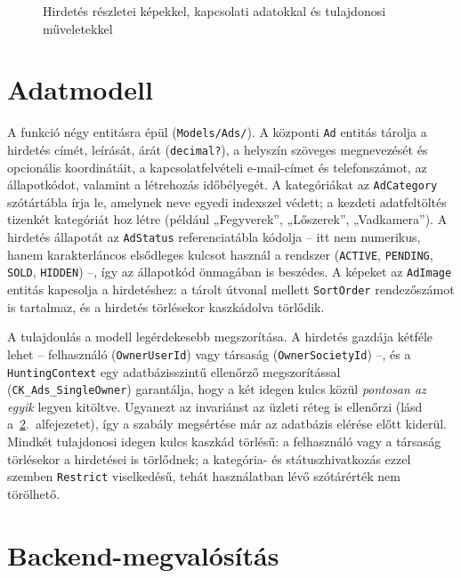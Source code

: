 \begin{figure}[htbp]
	\centering
	\caption{Hirdetés részletei képekkel, kapcsolati adatokkal és tulajdonosi műveletekkel}
	\label{fig:ad-detail-screen}
\end{figure}

\section{Adatmodell}
\label{sec:ads-adatmodell}

A funkció négy entitásra épül (\texttt{Models/Ads/}). A központi \texttt{Ad} entitás tárolja a
hirdetés címét, leírását, árát (\texttt{decimal?}), a helyszín szöveges megnevezését és opcionális
koordinátáit, a kapcsolatfelvételi e-mail-címet és telefonszámot, az állapotkódot, valamint a
létrehozás időbélyegét. A kategóriákat az \texttt{AdCategory} szótártábla írja le, amelynek neve
egyedi indexszel védett; a kezdeti adatfeltöltés tizenkét kategóriát hoz létre (például
„Fegyverek”, „Lőszerek”, „Vadkamera”). A hirdetés állapotát az \texttt{AdStatus} referenciatábla
kódolja -- itt nem numerikus, hanem karakterláncos elsődleges kulcsot használ a rendszer
(\texttt{ACTIVE}, \texttt{PENDING}, \texttt{SOLD}, \texttt{HIDDEN}) --, így az állapotkód
önmagában is beszédes. A képeket az \texttt{AdImage} entitás kapcsolja a hirdetéshez: a tárolt
útvonal mellett \texttt{SortOrder} rendezőszámot is tartalmaz, és a hirdetés törlésekor
kaszkádolva törlődik.

A tulajdonlás a modell legérdekesebb megszorítása. A hirdetés gazdája kétféle lehet --
felhasználó (\texttt{OwnerUserId}) vagy társaság (\texttt{OwnerSocietyId}) --, és a
\texttt{HuntingContext} egy adatbázisszintű ellenőrző megszorítással
(\texttt{CK\_Ads\_SingleOwner}) garantálja, hogy a két idegen kulcs közül \emph{pontosan az egyik}
legyen kitöltve. Ugyanezt az invariánst az üzleti réteg is ellenőrzi (lásd
a~\ref{sec:ads-backend}.~alfejezetet), így a szabály megsértése már az adatbázis elérése előtt
kiderül. Mindkét tulajdonosi idegen kulcs kaszkád törlésű: a felhasználó vagy a társaság
törlésekor a hirdetései is törlődnek; a kategória- és státuszhivatkozás ezzel szemben
\texttt{Restrict} viselkedésű, tehát használatban lévő szótárérték nem törölhető.

\section{Backend-megvalósítás}
\label{sec:ads-backend}

